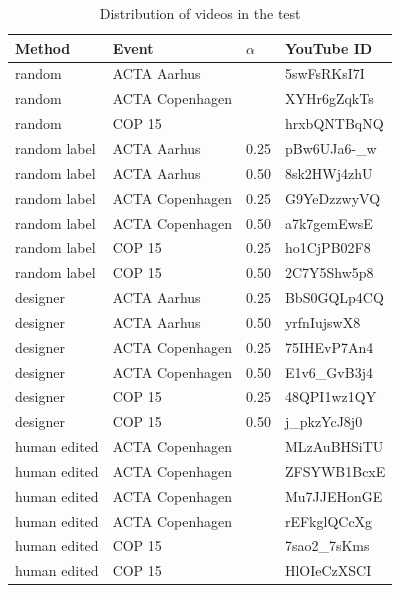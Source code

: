 \begin{table}\centering
    \begin{tabular}{|l|l|l|l|}
        \hline
        Method       & Event           & $\alpha$      & YouTube ID \\ \hline
        random       & ACTA Aarhus     & ~             & 5swFsRKsI7I \\ %
        random       & ACTA Copenhagen & ~             & XYHr6gZqkTs \\ %
        random       & COP 15          & ~             & hrxbQNTBqNQ \\ %
        random label & ACTA Aarhus     & 0.25          & pBw6UJa6-\_w \\ %
        random label & ACTA Aarhus     & 0.50          & 8sk2HWj4zhU \\ %
        random label & ACTA Copenhagen & 0.25          & G9YeDzzwyVQ \\ %
        random label & ACTA Copenhagen & 0.50          & a7k7gemEwsE \\ %
        random label & COP 15          & 0.25          & ho1CjPB02F8 \\ %
        random label & COP 15          & 0.50          & 2C7Y5Shw5p8 \\ %
        designer     & ACTA Aarhus     & 0.25          & BbS0GQLp4CQ \\ %
        designer     & ACTA Aarhus     & 0.50          & yrfnIujswX8 \\ %
        designer     & ACTA Copenhagen & 0.25          & 75IHEvP7An4 \\ %
        designer     & ACTA Copenhagen & 0.50          & E1v6\_GvB3j4 \\ %
        designer     & COP 15          & 0.25          & 48QPI1wz1QY \\ %
        designer     & COP 15          & 0.50          & j\_pkzYcJ8j0 \\ %
        human edited & ACTA Copenhagen & ~             & MLzAuBHSiTU \\ 
        human edited & ACTA Copenhagen & ~             & ZFSYWB1BcxE \\ 
        human edited & ACTA Copenhagen & ~             & Mu7JJEHonGE \\ 
        human edited & ACTA Copenhagen & ~             & rEFkglQCcXg \\ 
        human edited & COP 15          & ~             & 7sao2\_7sKms \\ 
        human edited & COP 15          & ~             & HlOIeCzXSCI \\
        \hline
    \end{tabular}
\caption{Distribution of videos in the test}\label{tab:videosintest}
\end{table}
%
